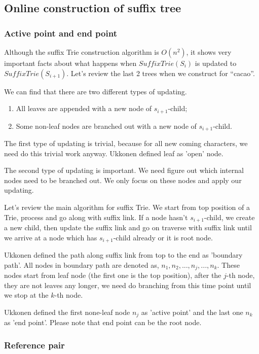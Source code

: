 \documentclass{article}
\begin{document}
\subsection{Online construction of suffix tree} 

\subsubsection{Active point and end point}
\label{ap-and-ep}
Although the suffix Trie construction algorithm is $O(n^2)$, it shows very
important facts about what happens when $SuffixTrie(S_i)$ is updated to
$SuffixTrie(S_{i+1})$. Let's review the last 2 trees when we construct for
``cacao''.

We can find that there are two different types of updating.
\begin{enumerate}
\item All leaves are appended with a new node of $s_{i+1}$-child;
\item Some non-leaf nodes are branched out with a new node of $s_{i+1}$-child.
\end{enumerate}

The first type of updating is trivial, because for all new coming characters,
we need do this trivial work anyway. Ukkonen defined leaf as 'open' node.

The second type of updating is important. We need figure out which internal
nodes need to be branched out. We only focus on these nodes and apply our
updating.

Let's review the main algorithm for suffix Trie. We start from top position
of a Trie, process and go along with suffix link. If a node hasn't $s_{i+1}$-child,
we create a new child, then update the suffix link and go on traverse with
suffix link until we arrive at a node which has $s_{i+1}$-child already or
it is root node.

Ukkonen defined the path along suffix link from top to the end as 'boundary path'.
All nodes in boundary path are denoted as, $n_1, n_2, ..., n_j, ..., n_k$.
These nodes start from leaf node (the first one is the top position), after
the $j$-th node, they are not leaves any longer, we need do branching from
this time point until we stop at the $k$-th node.

Ukkonen defined the first none-leaf node $n_j$ as 'active point' and the last
one $n_k$ as 'end point'. Please note that end point can be the root node.

\subsubsection{Reference pair}
\end{document}
